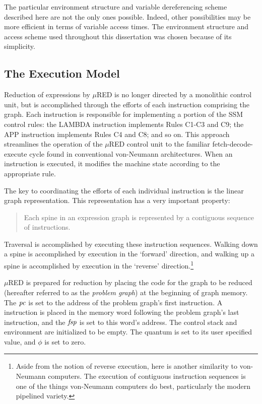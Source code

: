 The particular environment structure and variable dereferencing scheme described here are not the only ones possible. Indeed, other possibilities may be more efficient in terms of variable access times. The environment structure and access scheme used throughout this dissertation was chosen because of its simplicity.

\subsection{The Execution Model}

Reduction of expressions by \(\mu\)RED is no longer directed by a monolithic control unit, but is accomplished through the efforts of each instruction comprising the graph. Each instruction is responsible for implementing a portion of the SSM control rules: the LAMBDA instruction implements Rules C1-C3 and C9; the APP instruction implements Rules C4 and C8; and so on. This approach streamlines the operation of the \(\mu\)RED control unit to the familiar fetch-decode-execute cycle found in conventional von-Neumann architectures. When an instruction is executed, it modifies the machine state according to the appropriate rule.

The key to coordinating the efforts of each individual instruction is the linear graph representation. This representation has a very important property:

\begin{quote}
Each spine in an expression graph is represented by a contiguous sequence of instructions.
\end{quote}

Traversal is accomplished by executing these instruction sequences. Walking down a spine is accomplished by execution in the `forward' direction, and walking up a spine is accomplished by execution in the `reverse' direction.\footnote{Aside from the notion of reverse execution, here is another similarity to von-Neumann computers. The execution of contiguous instruction sequences is one of the things von-Neumann computers do best, particularly the modern pipelined variety.}

\(\mu\)RED is prepared for reduction by placing the code for the graph to be reduced (hereafter referred to as the \emph{problem graph}) at the beginning of graph memory. The \(\mathit{pc}\) is set to the address of the problem graph's first instruction. A  instruction is placed in the memory word following the problem graph's last instruction, and the \(\mathit{fsp}\) is set to this word's address. The control stack and environment are initialized to be empty. The quantum is set to its user specified value, and \(\phi\) is set to zero.

